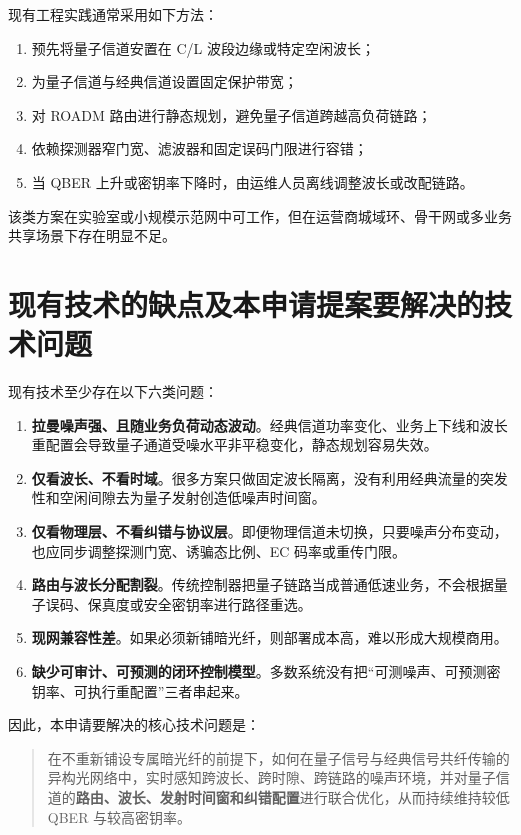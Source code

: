 \documentclass[12pt,a4paper]{article}
\begin{document}
现有工程实践通常采用如下方法：
\begin{enumerate}[label=(\arabic*)]
    \item 预先将量子信道安置在 C/L 波段边缘或特定空闲波长；
    \item 为量子信道与经典信道设置固定保护带宽；
    \item 对 ROADM 路由进行静态规划，避免量子信道跨越高负荷链路；
    \item 依赖探测器窄门宽、滤波器和固定误码门限进行容错；
    \item 当 QBER 上升或密钥率下降时，由运维人员离线调整波长或改配链路。
\end{enumerate}

该类方案在实验室或小规模示范网中可工作，但在运营商城域环、骨干网或多业务共享场景下存在明显不足。

\section{现有技术的缺点及本申请提案要解决的技术问题}

现有技术至少存在以下六类问题：
\begin{enumerate}[label=(\arabic*)]
    \item \textbf{拉曼噪声强、且随业务负荷动态波动}。经典信道功率变化、业务上下线和波长重配置会导致量子通道受噪水平非平稳变化，静态规划容易失效。
    \item \textbf{仅看波长、不看时域}。很多方案只做固定波长隔离，没有利用经典流量的突发性和空闲间隙去为量子发射创造低噪声时间窗。
    \item \textbf{仅看物理层、不看纠错与协议层}。即便物理信道未切换，只要噪声分布变动，也应同步调整探测门宽、诱骗态比例、EC 码率或重传门限。
    \item \textbf{路由与波长分配割裂}。传统控制器把量子链路当成普通低速业务，不会根据量子误码、保真度或安全密钥率进行路径重选。
    \item \textbf{现网兼容性差}。如果必须新铺暗光纤，则部署成本高，难以形成大规模商用。
    \item \textbf{缺少可审计、可预测的闭环控制模型}。多数系统没有把“可测噪声、可预测密钥率、可执行重配置”三者串起来。
\end{enumerate}

因此，本申请要解决的核心技术问题是：
\begin{quote}
在不重新铺设专属暗光纤的前提下，如何在量子信号与经典信号共纤传输的异构光网络中，实时感知跨波长、跨时隙、跨链路的噪声环境，并对量子信道的\textbf{路由、波长、发射时间窗和纠错配置}进行联合优化，从而持续维持较低 QBER 与较高密钥率。
\end{quote}
\end{document}
